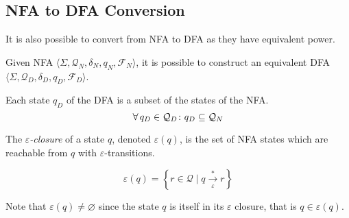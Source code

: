 \subsection{NFA to DFA Conversion}

It is also possible to convert from NFA to DFA as they have equivalent power.

\begin{definition}
    Given NFA $\langle \Sigma, \mathcal{Q}_N, \delta_N, q_N, \mathcal{F}_N \rangle$, it is possible to construct an equivalent DFA $\langle \Sigma, \mathcal{Q}_D, \delta_D, q_D, \mathcal{F}_D \rangle$.
    
    Each state $q_D$ of the DFA is a subset of the states of the NFA.
    \begin{equation}
        \operatorname{\forall} q_D \in \mathcal{Q}_D \colon q_D \subseteq \mathcal{Q}_N
    \end{equation}
\end{definition}

\begin{definition}
    The \textit{$\varepsilon$-closure} of a state $q$, denoted $\varepsilon(q)$, is the set of NFA states which are reachable from $q$ with $\varepsilon$-transitions.
    
    \begin{equation}
        \varepsilon(q) = \left\lbrace r \in \mathcal{Q} \mid q \xrightarrow[\varepsilon]{\ast} r \right\rbrace
    \end{equation}
    
    Note that $\varepsilon(q) \ne \varnothing$ since the state $q$ is itself in its $\varepsilon$ closure, that is $q \in \varepsilon(q)$.
\end{definition}

